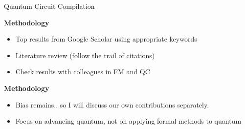 \begin{frame}{Quantum Circuit Compilation}

\vfill


\vfill

\pause

	\begin{block}{\bf Methodology}
		\begin{itemize}
		\item Top results from Google Scholar using appropriate keywords
		\item Literature review (follow the trail of citations)
		\item Check results with colleagues in FM and QC
		\end{itemize}
	\end{block}

\pause

\vfill


	\begin{alertblock}{\bf Methodology}
		\begin{itemize}
		\item Bias remains.. so I will discuss our own contributions separately.
		\pause
		\item Focus on advancing quantum, not on applying formal methods to quantum
		\end{itemize}
	\end{alertblock}



\end{frame}


